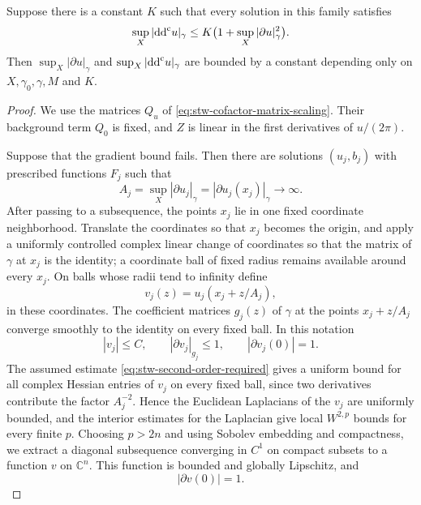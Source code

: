 \begin{proposition}\label{prop:stw-gradient-from-second-order}
Suppose there is a constant $K$ such that every solution in this family satisfies
\begin{equation}\label{eq:stw-second-order-required}
 \sup_X|\mathrm{dd}^{\mathrm{c}} u|_\gamma
       \leq K\bigl(1+\sup_X|\partial u|_\gamma^2\bigr).
\end{equation}
Then $\sup_X|\partial u|_\gamma$ and $\sup_X|\mathrm{dd}^{\mathrm{c}} u|_\gamma$ are bounded by a constant depending only on $X,\gamma_0,\gamma,M$ and $K$.
\end{proposition}
\begin{proof}
We use the matrices $Q_u$ of \eqref{eq:stw-cofactor-matrix-scaling}. Their background term $Q_0$ is fixed, and $Z$ is linear in the first derivatives of $u/(2\pi)$.

Suppose that the gradient bound fails. Then there are solutions $(u_j,b_j)$ with prescribed functions $F_j$ such that
\[
 A_j=\sup_X|\partial u_j|_\gamma
       =|\partial u_j(x_j)|_\gamma\longrightarrow\infty.
\]
After passing to a subsequence, the points $x_j$ lie in one fixed coordinate neighborhood. Translate the coordinates so that $x_j$ becomes the origin, and apply a uniformly controlled complex linear change of coordinates so that the matrix of $\gamma$ at $x_j$ is the identity; a coordinate ball of fixed radius remains available around every $x_j$. On balls whose radii tend to infinity define
\[
 v_j(z)=u_j(x_j+z/A_j),
\]
in these coordinates. The coefficient matrices $g_j(z)$ of $\gamma$ at the points $x_j+z/A_j$ converge smoothly to the identity on every fixed ball. In this notation
\[
 |v_j|\leq C,
 \qquad |\partial v_j|_{g_j}\leq1,
 \qquad |\partial v_j(0)|=1.
\]
The assumed estimate \eqref{eq:stw-second-order-required} gives a uniform bound for all complex Hessian entries of $v_j$ on every fixed ball, since two derivatives contribute the factor $A_j^{-2}$. Hence the Euclidean Laplacians of the $v_j$ are uniformly bounded, and the interior estimates for the Laplacian give local $W^{2,p}$ bounds for every finite $p$. Choosing $p>2n$ and using Sobolev embedding and compactness, we extract a diagonal subsequence converging in $C^1$ on compact subsets to a function $v$ on $\mathbb C^n$. This function is bounded and globally Lipschitz, and
\[
 |\partial v(0)|=1.
\]


\end{proof}
